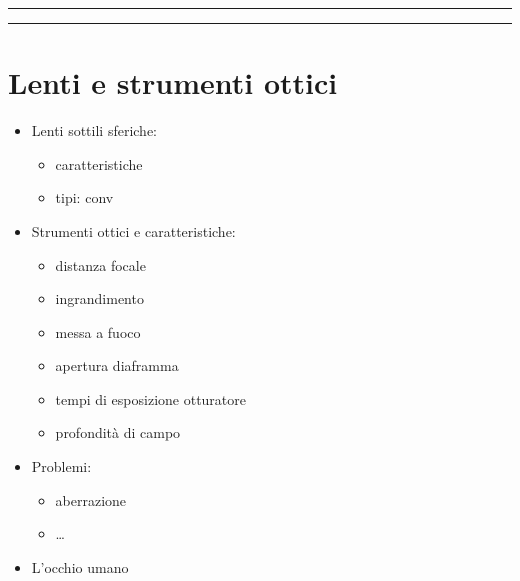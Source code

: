 \documentclass[letterpaper,10pt,italian]{jupyterBook}
\begin{document}
\bigskip\hrule\bigskip


\sphinxAtStartPar
{}


\bigskip\hrule\bigskip


\sphinxstepscope


\section{Lenti e strumenti ottici}
\label{\detokenize{ch/waves/optics-lens:lenti-e-strumenti-ottici}}\label{\detokenize{ch/waves/optics-lens:physics-hs-waves-optics-geometric-lenses}}\label{\detokenize{ch/waves/optics-lens::doc}}\begin{itemize}
\item {} 
\sphinxAtStartPar
Lenti sottili sferiche:
\begin{itemize}
\item {} 
\sphinxAtStartPar
caratteristiche

\item {} 
\sphinxAtStartPar
tipi: conv

\end{itemize}

\item {} 
\sphinxAtStartPar
Strumenti ottici e caratteristiche:
\begin{itemize}
\item {} 
\sphinxAtStartPar
distanza focale

\item {} 
\sphinxAtStartPar
ingrandimento

\item {} 
\sphinxAtStartPar
messa a fuoco

\item {} 
\sphinxAtStartPar
apertura \sphinxhyphen{} diaframma

\item {} 
\sphinxAtStartPar
tempi di esposizione \sphinxhyphen{} otturatore

\item {} 
\sphinxAtStartPar
profondità di campo

\end{itemize}

\item {} 
\sphinxAtStartPar
Problemi:
\begin{itemize}
\item {} 
\sphinxAtStartPar
aberrazione

\item {} 
\sphinxAtStartPar
…

\end{itemize}

\item {} 
\sphinxAtStartPar
L’occhio umano

\end{itemize}
\end{document}
